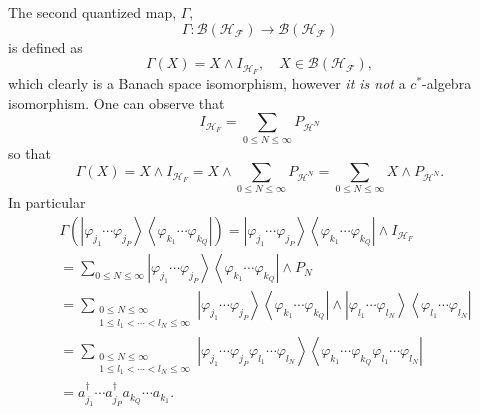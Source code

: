 \documentclass[aps,preprint]{revtex4}%
\begin{document}
The second quantized map, $\Gamma,$%
\begin{equation}
\Gamma:\mathcal{B}\left(  \mathcal{H}_{\mathcal{F}}\right)  \longrightarrow
\mathcal{B}\left(  \mathcal{H}_{\mathcal{F}}\right)
\end{equation}
is defined as
\begin{equation}
\Gamma\left(  X\right)  =X\wedge I_{\mathcal{H}_{F}},\quad X\in\mathcal{B}%
\left(  \mathcal{H}_{\mathcal{F}}\right)  ,
\end{equation}
which clearly is a Banach space isomorphism, however \emph{it is not} a
$c^{\ast}$-algebra isomorphism. One can observe that
\begin{equation}
I_{\mathcal{H}_{F}}=\sum_{0\leq N\leq\infty}P_{\mathcal{H}^{N}}%
\end{equation}
so that
\begin{equation}
\Gamma\left(  X\right)  =X\wedge I_{\mathcal{H}_{F}}=X\wedge\sum_{0\leq
N\leq\infty}P_{\mathcal{H}^{N}}=\sum_{0\leq N\leq\infty}X\wedge P_{\mathcal{H}%
^{N}}.
\end{equation}
In particular
\begin{align}
&  \Gamma\left(  \left\vert \varphi_{j_{1}}\cdots\varphi_{j_{P}}\right\rangle
\left\langle \varphi_{k_{1}}\cdots\varphi_{k_{Q}}\right\vert \right)
=\left\vert \varphi_{j_{1}}\cdots\varphi_{j_{P}}\right\rangle \left\langle
\varphi_{k_{1}}\cdots\varphi_{k_{Q}}\right\vert \wedge I_{\mathcal{H}_{F}%
}\nonumber\\
&  =\sum_{0\leq N\leq\infty}\left\vert \varphi_{j_{1}}\cdots\varphi_{j_{P}%
}\right\rangle \left\langle \varphi_{k_{1}}\cdots\varphi_{k_{Q}}\right\vert
\wedge P_{N}\nonumber\\
&  =\sum_{\substack{0\leq N\leq\infty\\1\leq l_{1}<\cdots<l_{N}\leq\infty
}}\left\vert \varphi_{j_{1}}\cdots\varphi_{j_{P}}\right\rangle \left\langle
\varphi_{k_{1}}\cdots\varphi_{k_{Q}}\right\vert \wedge\left\vert
\varphi_{l_{1}}\cdots\varphi_{l_{N}}\right\rangle \left\langle \varphi_{l_{1}%
}\cdots\varphi_{l_{N}}\right\vert \nonumber\\
&  =\sum_{\substack{0\leq N\leq\infty\\1\leq l_{1}<\cdots<l_{N}\leq\infty
}}\left\vert \varphi_{j_{1}}\cdots\varphi_{j_{P}}\varphi_{l_{1}}\cdots
\varphi_{l_{N}}\right\rangle \left\langle \varphi_{k_{1}}\cdots\varphi_{k_{Q}%
}\varphi_{l_{1}}\cdots\varphi_{l_{N}}\right\vert \nonumber\\
&  =a_{j_{1}}^{\dagger}\cdots a_{j_{P}}^{\dagger}a_{k_{Q}}\cdots a_{k_{1}}.
\end{align}
\end{document}
